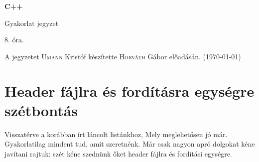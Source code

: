 \documentclass[a4paper,11.5pt]{article}
\begin{document}
	\setlength\parindent{0pt}
	\def\s{\hspace{0.2mm}\vphantom{\beta}}
	\def\Z{\mathbb{Z}}
	\def\Q{\mathbb{Q}}
	\def\R{\mathbb{R}}
	\def\C{\mathbb{C}}
	\def\N{\mathbb{N}}
	\def\Ra{\overline{\mathbb{R}}}
	
	\def\sume{\displaystyle\sum_{n=1}^{+\infty}}
	\def\sumn{\displaystyle\sum_{n=0}^{+\infty}}
	
	\def\narrow{\underset{n\rightarrow+\infty}{\longrightarrow}}
	\def\limn{\displaystyle\lim_{n\to +\infty}}
	\def\limx{\displaystyle\lim_{x\to +\infty}}
	
	\theoremstyle{definition}
	\newtheorem{theorem}{Tétel}[subsection] 
	
	\theoremstyle{definition}
	\newtheorem{definition}[theorem]{Definíció} 
	\newtheorem{example}[theorem]{Példa} 
	\newtheorem{task}[theorem]{Feladat} 
	\newtheorem{note}[theorem]{Megjegyzés}
	\begin{center}
		{\LARGE\textbf{C++}}
		
		{\Large Gyakorlat jegyzet}
		
		8. óra.
	\end{center}
	A jegyzetet \textsc{Umann} Kristóf készítette \textsc{Horváth} Gábor  előadásán. (\today)
	\section{Header fájlra és fordításra egységre szétbontás}
	Visszatérve a korábban írt láncolt listánkhoz, Mely meglehetősen jó már. Gyakorlatilag mindent tud, amit szeretnénk. Már csak nagyon apró dolgokat kéne javítani rajtuk: szét kéne szednünk őket header fájlra és fordítási egységre. 
	
\end{document}
